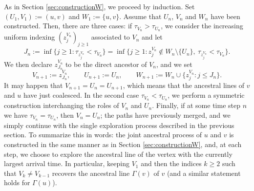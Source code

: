 \documentclass[french]{article}
\newcommand{\zi}{z}
\renewcommand{\1}{\mathds{1}}
\begin{document}
\medskip
As in Section \ref{sec:constructionW}, we proceed by induction. Set $(U_1,V_1):=(u,v)$ and $W_1:=\{u, v\}$. Assume that $U_n$, $V_n$ and $W_n$ have been constructed. Then, there are three cases: if $\tau_{V_n}>\tau_{U_n}$, we consider the increasing uniform indexing $(\zi_j^{V_n})_{j\ge 1}$ associated to $V_n$ and let 
$$J_n := \inf\{j \ge 1 : \tau_{\zi_j^{V_n}} < \tau_{V_n}\}
     = \inf\{j \ge 1 : \zi_j^{V_n} \notin W_n\setminus\{U_n\},\ \tau_{\zi_j^{V_n}} < \tau_{V_n}\}.$$
We then declare $\zi_{J_n}^{V_n}$ to be the direct ancestor of $V_n$, and we set
$$
V_{n+1} := \zi_{J_n}^{V_n}, \qquad U_{n+1} := U_n,
\qquad
W_{n+1} := W_n \cup \{\zi_j^{V_n} : j \le J_n\}.
$$
It may happen that $V_{n+1}=U_n=U_{n+1}$, which means that the ancestral lines of $v$ and $u$ have just coalesced. In the second case $\tau_{V_n}<\tau_{U_n}$, we perform a symmetric construction interchanging the roles of $V_n$ and $U_n$. Finally, if at some time step $n$ we have $\tau_{V_n}=\tau_{U_n}$, then $V_n=U_n$; the paths have previously merged, and we simply continue with the single exploration process described in the previous section. To summarize this in words: the joint ancestral process of $u$ and $v$ is constructed in the same manner as in Section \ref{sec:constructionW}, and, at each step, we choose to explore the ancestral line of the vertex with the currently largest arrival time. In particular, keeping $V_1$ and then the indices $k\ge 2$ such that $V_k \neq V_{k-1}$ recovers the ancestral line $\Gamma(v)$ of $v$ (and a similar statement holds for $\Gamma(u)$).

\bigskip
\end{document}
